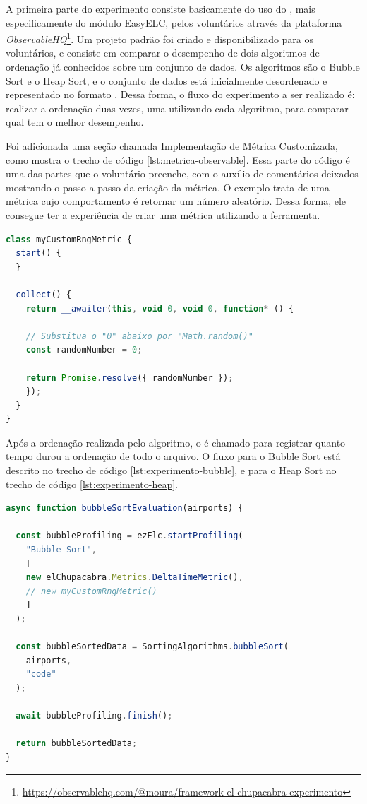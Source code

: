 \documentclass[12pt]{tcc}
\begin{document}


	A primeira parte do experimento consiste basicamente do uso do , mais especificamente do módulo EasyELC, pelos voluntários através da plataforma \emph{ObservableHQ}\footnote{\url{https://observablehq.com/@moura/framework-el-chupacabra-experimento}}. Um projeto padrão foi criado e disponibilizado para os voluntários, e consiste em comparar o desempenho de dois algoritmos de ordenação já conhecidos sobre um conjunto de dados. Os algoritmos são o Bubble Sort e o Heap Sort, e o conjunto de dados está inicialmente desordenado e representado no formato . Dessa forma, o fluxo do experimento a ser realizado é: realizar a ordenação duas vezes, uma utilizando cada algoritmo, para comparar qual tem o melhor desempenho.

	Foi adicionada uma seção chamada Implementação de Métrica Customizada, como mostra o trecho de código \ref{lst:metrica-observable}. Essa parte do código é uma das partes que o voluntário preenche, com o auxílio de comentários deixados mostrando o passo a passo da criação da métrica. O exemplo trata de uma métrica cujo comportamento é retornar um número aleatório. Dessa forma, ele consegue ter a experiência de criar uma métrica utilizando a ferramenta.


\begin{lstlisting}[label={lst:metrica-observable}, caption={Seção para criação de métrica customizada pelo usuário no experimento.}, language=TypeScript, breaklines=true]
class myCustomRngMetric {
  start() {
  }

  collect() {
    return __awaiter(this, void 0, void 0, function* () {

    // Substitua o "0" abaixo por "Math.random()"
    const randomNumber = 0;

    return Promise.resolve({ randomNumber });
    });
  }
}
\end{lstlisting}


	Após a ordenação realizada pelo algoritmo, o  é chamado para registrar quanto tempo durou a ordenação de todo o arquivo. O fluxo para o Bubble Sort está descrito no trecho de código \ref{lst:experimento-bubble}, e para o Heap Sort no trecho de código \ref{lst:experimento-heap}.


\begin{lstlisting}[label={lst:experimento-bubble}, caption={Fluxo de código referente a execução da ordenação com o Bubble Sort.}, language=TypeScript, breaklines=true]
async function bubbleSortEvaluation(airports) {

  const bubbleProfiling = ezElc.startProfiling(
    "Bubble Sort",
    [
    new elChupacabra.Metrics.DeltaTimeMetric(),
    // new myCustomRngMetric()
    ]
  );

  const bubbleSortedData = SortingAlgorithms.bubbleSort(
    airports,
    "code"
  );

  await bubbleProfiling.finish();
    
  return bubbleSortedData;
}
\end{lstlisting}
\end{document}
